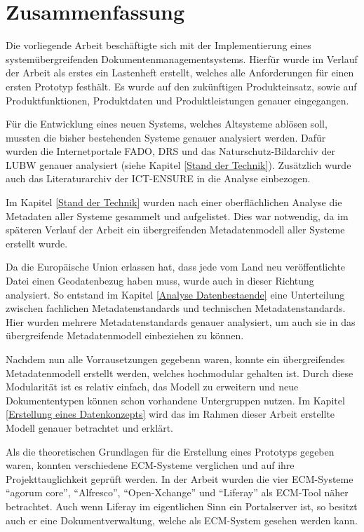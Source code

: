 \section{Zusammenfassung}
Die vorliegende Arbeit besch\"aftigte sich mit der Implementierung eines system\"ubergreifenden Dokumentenmanagementsystems.
Hierf\"ur wurde im Verlauf der Arbeit als erstes ein Lastenheft erstellt, welches alle Anforderungen f\"ur einen ersten Prototyp festh\"alt.
Es wurde auf den zuk\"unftigen Produkteinsatz, sowie auf Produktfunktionen, Produktdaten und Produktleistungen genauer eingegangen.

F\"ur die Entwicklung eines neuen Systems, welches Altsysteme abl\"osen soll, mussten die bisher bestehenden Systeme genauer analysiert werden. Daf\"ur wurden die Internetportale \ac{FADO}, \ac{DRS} und das Naturschutz-Bildarchiv der LUBW genauer analysiert (siehe Kapitel \ref{Stand der Technik}). Zus\"atzlich wurde auch das Literaturarchiv der \ac{ICT-ENSURE} in die Analyse einbezogen.

Im Kapitel \ref{Stand der Technik} wurden nach einer oberfl\"achlichen Analyse die Metadaten aller Systeme gesammelt und aufgelistet. Dies war notwendig, da im sp\"ateren Verlauf der Arbeit ein \"ubergreifenden Metadatenmodell aller Systeme erstellt wurde.

Da die Europ\"aische Union erlassen hat, dass jede vom Land neu ver\"offentlichte Datei einen Geodatenbezug haben muss, wurde auch in dieser Richtung analysiert. So entstand im Kapitel \ref{Analyse Datenbestaende} eine Unterteilung zwischen fachlichen Metadatenstandards und technischen Metadatenstandards. Hier wurden mehrere Metadatenstandards genauer analysiert, um auch sie in das \"ubergreifende Metadatenmodell einbeziehen zu k\"onnen.

Nachdem nun alle Vorrausetzungen gegebenn waren, konnte ein \"ubergreifendes Metadatenmodell erstellt werden, welches hochmodular gehalten ist. Durch diese Modularit\"at ist es relativ einfach, das Modell zu erweitern und neue Dokumententypen k\"onnen schon vorhandene Untergruppen nutzen. Im Kapitel \ref{Erstellung eines Datenkonzepts} wird das im Rahmen dieser Arbeit erstellte Modell genauer betrachtet und erkl\"art.

Als die theoretischen Grundlagen f\"ur die Erstellung eines Prototyps gegeben waren, konnten verschiedene ECM-Systeme verglichen und auf ihre Projekttauglichkeit gepr\"uft werden. In der Arbeit wurden die vier ECM-Systeme "`agorum core"', "`Alfresco"', "`Open-Xchange"' und "`Liferay"' als ECM-Tool n\"aher betrachtet. Auch wenn Liferay im eigentlichen Sinn ein Portalserver ist, so besitzt auch er eine Dokumentverwaltung, welche als ECM-System gesehen werden kann. 

